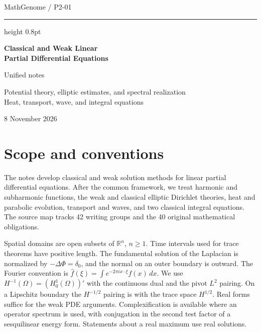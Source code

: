 \documentclass[11pt,oneside,openany]{book}
\theoremstyle{plain}
\theoremstyle{definition}
\theoremstyle{remark}
\begin{document}
\frontmatter
\hypersetup{pageanchor=false}
\begin{titlepage}
\thispagestyle{empty}
\vspace*{31mm}
{\large MathGenome \enspace / \enspace P2-01\par}
\vspace{7mm}
\hrule height 0.8pt
\vspace{11mm}
{\Huge\bfseries Classical and Weak Linear\\[2mm]
Partial Differential Equations\par}
\vspace{13mm}
{\large Unified notes\par}
\vspace{4mm}
{\normalsize Potential theory, elliptic estimates, and spectral realization\\
Heat, transport, wave, and integral equations\par}
\vfill
{\large 8 November 2026\par}
\end{titlepage}
\hypersetup{pageanchor=true}
\tableofcontents

\chapter*{Scope and conventions}
The notes develop classical and weak solution methods for linear
partial differential equations. After the common framework, we treat
harmonic and subharmonic functions, the weak and classical elliptic
Dirichlet theories, heat and parabolic evolution, transport and waves,
and two classical integral equations. The source map tracks 42 writing
groups and the 40 original mathematical obligations.

Spatial domains are open subsets of \(\mathbb R^n\), \(n\ge 1\).
Time intervals used for trace theorems have positive length.
The fundamental solution of the Laplacian is normalized by
\(-\Delta\Phi=\delta_0\), and the normal on an outer boundary is
outward. The Fourier convention is
\(\widehat f(\xi)=\int e^{-2\pi i x\cdot \xi}f(x)\,dx\).
We use \(H^{-1}(\Omega)=(H^1_0(\Omega))'\) with the continuous dual
and the pivot \(L^2\) pairing. On a Lipschitz boundary the
\(H^{-1/2}\) pairing is with the trace space \(H^{1/2}\).
Real forms suffice for the weak PDE arguments. Complexification
is available where an operator spectrum is used, with conjugation
in the second test factor of a sesquilinear energy form. Statements
about a real maximum use real solutions.
\end{document}

